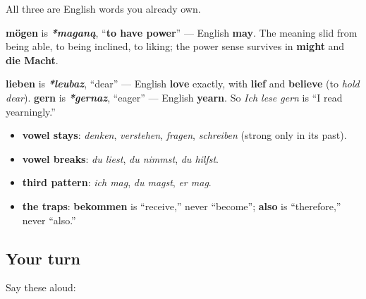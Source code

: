 \begin{cousinweb}
All three are English words you already own.

\textbf{mögen} is \emph{\textbf{*maganą}}, \textquotedblleft{}\textbf{to have power}\textquotedblright{} — English \textbf{may}. The meaning slid from being able, to being inclined, to liking; the power sense survives in \textbf{might} and \textbf{die Macht}.

\textbf{lieben} is \emph{\textbf{*leubaz}}, \textquotedblleft{}dear\textquotedblright{} — English \textbf{love} exactly, with \textbf{lief} and \textbf{believe} (to \emph{hold dear}). \textbf{gern} is \emph{\textbf{*gernaz}}, \textquotedblleft{}eager\textquotedblright{} — English \textbf{yearn}. So \emph{Ich lese gern} is \textquotedblleft{}I read yearningly.\textquotedblright{}
\end{cousinweb}

\begin{grammarlens}[title={What you've built across these two chapters}]
\begin{itemize}
\raggedright
  \item \textbf{vowel stays}: \emph{denken}, \emph{verstehen}, \emph{fragen}, \emph{schreiben} (strong only in its past).
  \item \textbf{vowel breaks}: \emph{du liest}, \emph{du nimmst}, \emph{du hilfst}.
  \item \textbf{third pattern}: \emph{ich mag}, \emph{du magst}, \emph{er mag}.
  \item \textbf{the traps}: \textbf{bekommen} is \textquotedblleft{}receive,\textquotedblright{} never \textquotedblleft{}become\textquotedblright{}; \textbf{also} is \textquotedblleft{}therefore,\textquotedblright{} never \textquotedblleft{}also.\textquotedblright{}
\end{itemize}
\end{grammarlens}

\subsection*{Your turn}
Say these aloud:

